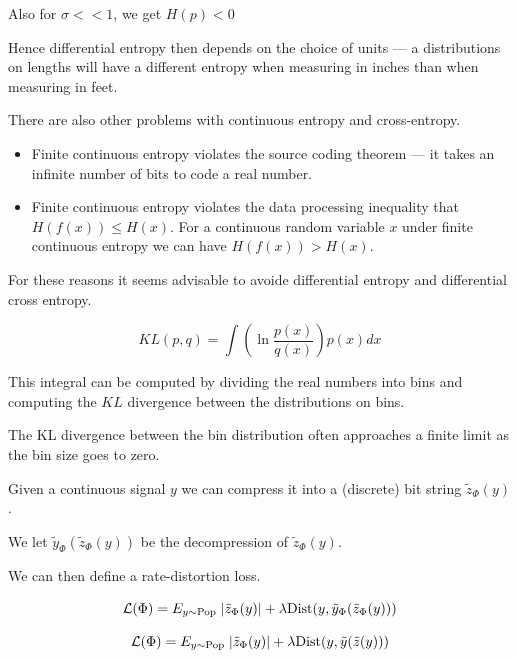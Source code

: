 {\vfill
Also for $\sigma << 1$, we get $H(p) < 0$

\vfill
Hence differential entropy then depends on the choice of units --- a distributions on lengths will have a different entropy
when measuring in inches than when measuring in feet.


There are also other problems with continuous entropy and cross-entropy.

\vfill
\begin{itemize}
\item Finite continuous entropy violates the source coding theorem --- it takes an infinite number of bits to code a real number.

\vfill
\item Finite continuous entropy violates the data processing inequality that $H(f(x)) \leq H(x)$.  For a continuous random variable $x$ under finite continuous entropy we can have $H(f(x)) > H(x)$.
\end{itemize}

\vfill
For these reasons it seems advisable to avoide differential entropy and differential cross entropy.


$$KL(p,q) = \int \left( \ln \frac{p(x)}{q(x)}\right) p(x) dx$$

\vfill
This integral can be computed by dividing the real numbers into bins and computing the $KL$ divergence between the distributions on bins.

\vfill
The KL divergence between the bin distribution often approaches a finite limit as the bin size goes to zero.



Given a continuous signal $y$ we can compress it into a (discrete) bit string $\tilde{z}_\Phi(y)$.

\vfill
We let $\tilde{y}_\Phi(\tilde{z}_\Phi(y))$ be the decompression of $\tilde{z}_\Phi(y)$.

\vfill
We can then define a rate-distortion loss.

{\color{red} $${\cal L}(\Phi) = E_{y \sim \mathrm{Pop}}\;|\tilde{z}_\Phi(y)| + \lambda \mathrm{Dist}(y,\tilde{y}_\Phi(\tilde{z}_\Phi(y)))$$}


{\color{red} $${\cal L}(\Phi) = E_{y \sim \mathrm{Pop}}\;|\tilde{z}_\Phi(y)| + \lambda \mathrm{Dist}(y,\tilde{y}(\tilde{z}(y)))$$}

}
